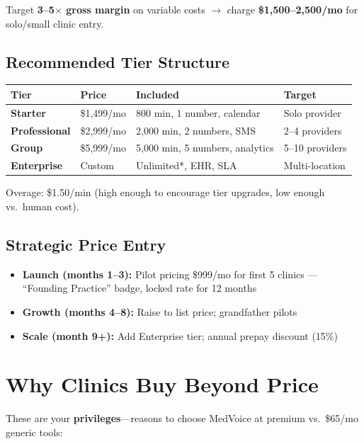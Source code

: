 \documentclass[11pt,a4paper]{article}
\begin{document}
Target \textbf{3--5$\times$ gross margin} on variable costs $\rightarrow$ charge \textbf{\$1,500--2,500/mo} for solo/small clinic entry.

\subsection{Recommended Tier Structure}

\begin{center}
\small
\begin{tabular}{@{}llll@{}}
\toprule
\textbf{Tier} & \textbf{Price} & \textbf{Included} & \textbf{Target} \\
\midrule
\textbf{Starter} & \$1,499/mo & 800 min, 1 number, calendar & Solo provider \\
\textbf{Professional} & \$2,999/mo & 2,000 min, 2 numbers, SMS & 2--4 providers \\
\textbf{Group} & \$5,999/mo & 5,000 min, 5 numbers, analytics & 5--10 providers \\
\textbf{Enterprise} & Custom & Unlimited*, EHR, SLA & Multi-location \\
\bottomrule
\end{tabular}
\end{center}
Overage: \$1.50/min (high enough to encourage tier upgrades, low enough vs.\ human cost).

\subsection{Strategic Price Entry}

\begin{itemize}[nosep]
  \item \textbf{Launch (months 1--3):} Pilot pricing \$999/mo for first 5 clinics --- ``Founding Practice'' badge, locked rate for 12 months
  \item \textbf{Growth (months 4--8):} Raise to list price; grandfather pilots
  \item \textbf{Scale (month 9+):} Add Enterprise tier; annual prepay discount (15\%)
\end{itemize}

\section{Why Clinics Buy Beyond Price}

These are your \textbf{privileges}---reasons to choose MedVoice at premium vs.\ \$65/mo generic tools:
\end{document}
